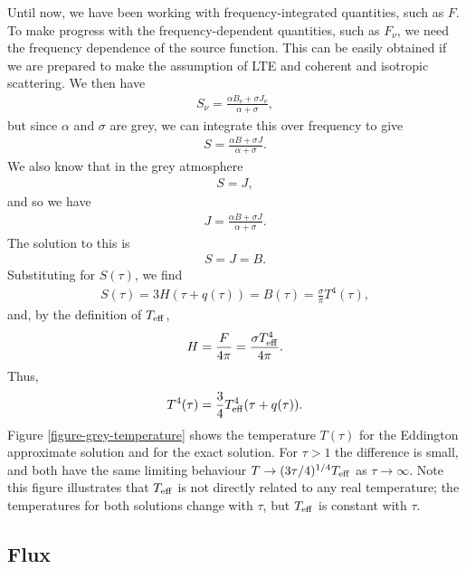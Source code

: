 Until now, we have been working with frequency-integrated
quantities, such as $F$. To make progress with the
frequency-dependent quantities, such as $F_\nu$, we need the
frequency dependence of the source function. This can be
easily obtained if we are prepared to make the assumption of
LTE and coherent and isotropic scattering. We then have
\begin{align}
S_\nu = \frac{\alpha B_\nu + \sigma J_\nu}{\alpha + \sigma},
\end{align}
but since $\alpha$ and $\sigma$ are grey, we can integrate this over frequency to give
\begin{align}
S = \frac{\alpha B + \sigma J}{\alpha + \sigma}.
\end{align}
We also know that in the grey atmosphere
\begin{align}
S = J,
\end{align}
and so we have
\begin{align}
J = \frac{\alpha B + \sigma J}{\alpha + \sigma}.
\end{align}
The solution to this is
\begin{align}
S = J = B.
\end{align}
Substituting for $S(\tau)$, we find
\begin{align}
S(\tau) = 3H(\tau + q(\tau)) = B(\tau) = \frac{\sigma}{\pi} T^4(\tau),
\end{align}
and, by the definition of $T_\mathrm{eff}$,
\begin{align}
H = \frac{F}{4\pi} = \frac{\sigma T_\mathrm{eff}^4}{4\pi}.
\end{align}
Thus, 
\begin{align}
T^4(\tau) = \frac{3}{4} T_\mathrm{eff}^4 (\tau + q(\tau)).
\end{align}
Figure
\ref{figure-grey-temperature} shows
the temperature $T(\tau)$ for the Eddington approximate
solution and for the exact solution. For $\tau > 1$ the
difference is small, and both have the same limiting
behaviour $T \rightarrow (3\tau/4)^{1/4}T_\mathrm{eff}$ as $\tau
\rightarrow \infty$.
Note this figure illustrates that $T_\mathrm{eff}$ is not directly
related to any real temperature; the temperatures for both
solutions change with $\tau$, but $T_\mathrm{eff}$ is constant with
$\tau$.

\newslide

\subsection{Flux}

